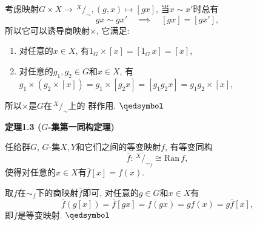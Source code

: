 \documentclass[UTF8]{ctexart}
\begin{document}
考虑映射$G\times X\to\,\!^{\displaystyle X}\!/_{\displaystyle\sim},
(g,x)\mapsto[gx]$, 当$x\sim x'$时总有
\[
    gx\sim gx'\quad\implies\quad[gx]=[gx'],
\]
所以它可以诱导商映射$\times$, 它满足:
\begin{enumerate}
    \item 对任意的$x\in X$, 有$1_G\times[x]=[1_G\,x]=[x]$,
    \item 对任意的$g_1,g_2\in G$和$x\in X$, 有
    $g_1\times(g_2\times[x])=g_1\times[g_2x]=[g_1g_2x]=g_1g_2\times[x]$,
\end{enumerate}
\vspace{3pt}
所以$\times$是$G$在$\,\!^{\displaystyle X}\!/_{\displaystyle\sim}$上的
群作用. \hfill $\qedsymbol$

\vspace{15pt}

\hypertarget{sec:定理1.3}{}
\noindent\textbf{定理1.3 ($G$-集第一同构定理)}

任给群$G$, $G$-集$X,Y$和它们之间的等变映射$f$, 有等变同构
\vspace{3pt}
\[
    \overline{f}:\,\!^{\displaystyle X}\!/_{\displaystyle\sim_f}
    \cong\mathrm{Ran}\,f,
\]
使得对任意的$x\in X$有$\overline{f}[x]=f(x)$.


取$f$在$\sim_f$下的商映射$\overline{f}$即可, 对任意的$g\in G$和$x\in X$有
\[
    \overline{f}(g[x])=\overline{f}[gx]=f(gx)=gf(x)=g\overline{f}[x],
\]
即$\overline{f}$是等变映射. \hfill $\qedsymbol$
\end{document}

